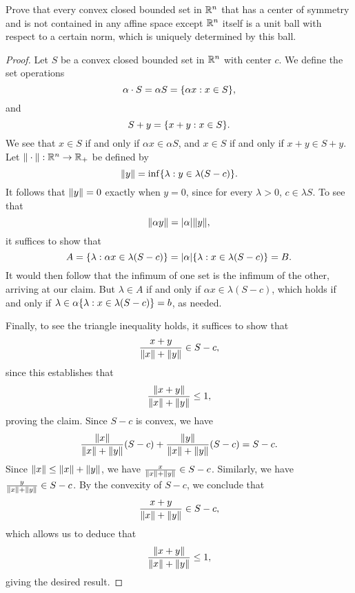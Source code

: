 \begin{minorEx}
    Prove that every convex closed bounded set in $\mathbb{R}^n$ that has a center of
    symmetry and is not contained in any affine space except $\mathbb{R}^n$ itself is a
    unit ball with respect to a certain norm, which is uniquely determined by
    this ball.
\end{minorEx}

\begin{proof}
    Let $S$ be a convex closed bounded set in $\mathbb{R}^n$ with center $c$. We define
    the set operations
    \[
        \alpha \cdot S = \alpha S = \{\alpha x : x \in S\},
    \]
    and
    \[
        S + y = \{x + y : x \in S\}.
    \]
    We see that $x \in S$ if and only if $\alpha x \in \alpha S$, and $x \in S$
    if and only if $x + y \in S + y$. Let $\Vert\cdot\Vert : \mathbb{R}^n
    \to \mathbb{R}_{+}$ be defined by
    \[
        \Vert y\Vert = \inf \{\lambda : y \in \lambda (S - c)\}.
    \]
    It follows that $\Vert y\Vert = 0$ exactly when $y = 0$, since for every
    $\lambda > 0$, $c \in \lambda S$. To see that
    \[
        \Vert\alpha y\Vert = |\alpha| \Vert y\Vert,
    \]
    it suffices to show that 
    \[
        A = \{\lambda : \alpha x \in \lambda (S - c)\} =
        |\alpha| \{\lambda : x \in \lambda (S - c)\} = B.
    \]
    It would then follow that the infimum of one set is the infimum of the
    other, arriving at our claim. But $\lambda \in A$ if and only if $\alpha x \in
    \lambda(S - c)$, which holds if and only if $\lambda \in \alpha \{\lambda
        : x \in \lambda (S - c)\} = b$, as needed.

    Finally, to see the triangle inequality holds, it suffices to show that 
    \[
        \frac{x + y}{\Vert x\Vert + \Vert y\Vert} \in S - c,
    \]
    since this establishes that
    \[
        \frac{\Vert x + y\Vert}{\Vert x\Vert + \Vert y\Vert} \leq 1,
    \]
    proving the claim. Since $S-c$ is convex, we have
    \[
        \frac{\Vert x\Vert}{\Vert x\Vert + \Vert y\Vert} (S - c) + 
        \frac{\Vert y\Vert}{\Vert x\Vert + \Vert y\Vert} (S - c) = 
        S - c.
    \]
    Since $\Vert x\Vert \leq \Vert x\Vert + \Vert y\Vert$, we have $\frac{x}{\Vert x\Vert +
    \Vert y\Vert} \in S - c$. Similarly, we have $\frac{y}{\Vert x\Vert + \Vert y\Vert} \in
    S - c$. By the convexity of $S - c$, we conclude that 
    \[
        \frac{x + y}{\Vert x\Vert + \Vert y\Vert} \in S - c,
    \]
    which allows us to deduce that
    \[
        \frac{\Vert x + y\Vert}{\Vert x\Vert + \Vert y\Vert} \leq 1,
    \]
    giving the desired result.
\end{proof}
